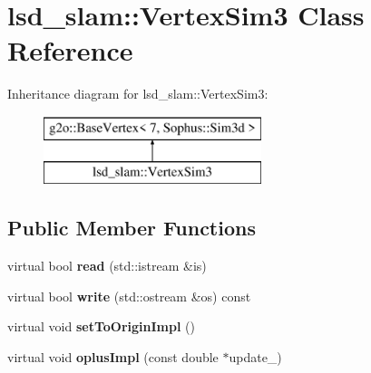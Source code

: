 \hypertarget{classlsd__slam_1_1_vertex_sim3}{\section{lsd\-\_\-slam\-:\-:Vertex\-Sim3 Class Reference}
\label{classlsd__slam_1_1_vertex_sim3}
}
Inheritance diagram for lsd\-\_\-slam\-:\-:Vertex\-Sim3\-:\begin{figure}[H]
\begin{center}
\leavevmode
\includegraphics[height=2.000000cm]{classlsd__slam_1_1_vertex_sim3}
\end{center}
\end{figure}
\subsection*{Public Member Functions}
\begin{DoxyCompactItemize}
\item 
\hypertarget{classlsd__slam_1_1_vertex_sim3_af385a9fd972a3d93ff554c655d93eaa4}{virtual bool {\bfseries read} (std\-::istream \&is)}\label{classlsd__slam_1_1_vertex_sim3_af385a9fd972a3d93ff554c655d93eaa4}

\item 
\hypertarget{classlsd__slam_1_1_vertex_sim3_aa2a67fe0082a83262a5495f4e75dd5ae}{virtual bool {\bfseries write} (std\-::ostream \&os) const }\label{classlsd__slam_1_1_vertex_sim3_aa2a67fe0082a83262a5495f4e75dd5ae}

\item 
\hypertarget{classlsd__slam_1_1_vertex_sim3_afbd6e2b2548e3784e2ff9abe1c5d0bc9}{virtual void {\bfseries set\-To\-Origin\-Impl} ()}\label{classlsd__slam_1_1_vertex_sim3_afbd6e2b2548e3784e2ff9abe1c5d0bc9}

\item 
\hypertarget{classlsd__slam_1_1_vertex_sim3_a16e001bf528706acb8d327930c833e02}{virtual void {\bfseries oplus\-Impl} (const double $\ast$update\-\_\-)}\label{classlsd__slam_1_1_vertex_sim3_a16e001bf528706acb8d327930c833e02}

\end{DoxyCompactItemize}
